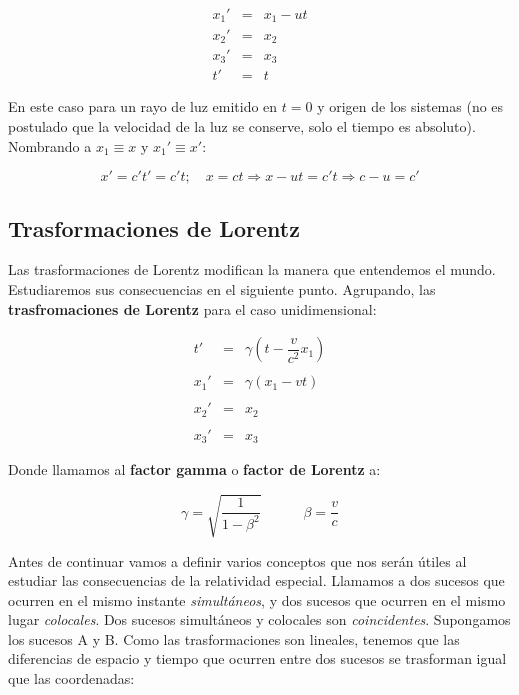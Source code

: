 \documentclass[12pt,a4paper]{book}
\newcommand{\parentesis}[1]{\left( #1  \right)}
\newcommand{\tquad}{\quad \quad \quad}
\begin{document}
\begin{equation}
\begin{array}{rcl}
x_1'&  = & x_1 - ut \\
x_2' & = & x_2 \\
x_3' & = & x_3 \\
t' & = &  t
\end{array}
\end{equation}

En este caso para un rayo de luz emitido en $t=0$ y origen de los sistemas (no es postulado que la velocidad de la luz se conserve, solo el tiempo es absoluto). Nombrando a $x_1 \equiv x$ y $x_1' \equiv x'$:

$$ x' = c't' = c' t ; \quad x = c t \Longrightarrow x - ut = c' t \Longrightarrow c - u = c' $$


\subsection{Trasformaciones de Lorentz}
Las trasformaciones de Lorentz modifican la manera que entendemos el mundo. Estudiaremos sus consecuencias en el siguiente punto. Agrupando, las \textbf{trasfromaciones de Lorentz} para el caso unidimensional:

\begin{equation}
\begin{array}{rll}
t' & = & \gamma \parentesis{ t - \dfrac{v}{c^2} x_1} \\ \\

x_1' & = & \gamma \parentesis{x_1 - vt} \\ \\

x_2 ' &  = & x_2 \\ \\

x_3 ' & = & x_3
\end{array} \label{Ec:4.1.2-002}
\end{equation}

Donde llamamos al \textbf{factor gamma} o \textbf{factor de Lorentz} a:

\begin{equation}
\gamma = \sqrt{\dfrac{1}{1 - \beta^2}}  \tquad \beta = \dfrac{v}{c}
\end{equation}

Antes de continuar vamos a definir varios conceptos que nos serán útiles al estudiar las consecuencias de la relatividad especial. Llamamos a dos sucesos que ocurren en el mismo instante \textit{simultáneos}, y dos sucesos que ocurren en el mismo lugar \textit{colocales}. Dos sucesos simultáneos y colocales son \textit{coincidentes}. Supongamos los sucesos A y B. Como las trasformaciones son lineales, tenemos que las diferencias de espacio y tiempo que ocurren entre dos sucesos se trasforman igual que las coordenadas:
\end{document}
